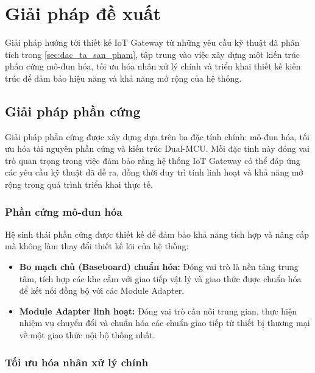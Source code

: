 \section{Giải pháp đề xuất}
    Giải pháp hướng tới thiết kế IoT Gateway từ những yêu cầu kỹ thuật đã phân tích trong \autoref{sec:dac_ta_san_pham}, tập trung vào việc xây dựng một kiến trúc phần cứng mô-đun hóa, tối ưu hóa nhân xử lý chính và triển khai thiết kế kiến trúc để đảm bảo hiệu năng và khả năng mở rộng của hệ thống.
        \subsection{Giải pháp phần cứng}
            Giải pháp phần cứng được xây dựng dựa trên ba đặc tính chính: mô-đun hóa, tối ưu hóa tài nguyên phần cứng và kiến trúc Dual-MCU. Mỗi đặc tính này đóng vai trò quan trọng trong việc đảm bảo rằng hệ thống IoT Gateway có thể đáp ứng các yêu cầu kỹ thuật đã đề ra, đồng thời duy trì tính linh hoạt và khả năng mở rộng trong quá trình triển khai thực tế.
            \subsubsection{Phần cứng mô-đun hóa}
                Hệ sinh thái phần cứng được thiết kế để đảm bảo khả năng tích hợp và nâng cấp mà không làm thay đổi thiết kế lõi của hệ thống:
                \begin{itemize}
                    \item \textbf{Bo mạch chủ (Baseboard) chuẩn hóa:} Đóng vai trò là nền tảng trung tâm, tích hợp các khe cắm với giao tiếp vật lý và giao thức được chuẩn hóa để kết nối đồng bộ với các Module Adapter.
                    \item \textbf{Module Adapter linh hoạt:} Đóng vai trò cầu nối trung gian, thực hiện nhiệm vụ chuyển đổi và chuẩn hóa các chuẩn giao tiếp từ thiết bị thương mại về một giao thức nội bộ thống nhất.
                \end{itemize}

            \subsubsection{Tối ưu hóa nhân xử lý chính}
                
